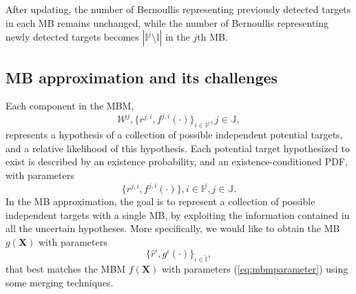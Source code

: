 \documentclass[journal]{IEEEtran}
\begin{document}
After updating, the number of Bernoullis representing previously detected targets in each MB remains unchanged, while the number of Bernoullis representing newly detected targets becomes $|\mathbb{I}^j\setminus\mathbb{I}|$ in the $j$th MB. 

\subsection{MB approximation and its challenges}
\label{section:challenge}
Each component in the MBM,
\begin{equation}
    \mathcal{W}^j,\{r^{j,i},f^{j,i}(\cdot)\}_{i\in\mathbb{I}^j}, j\in\mathbb{J},
\end{equation}
represents a hypothesis of a collection of possible independent potential targets, and a relative likelihood of this hypothesis. Each potential target hypothesized to exist is described by an existence probability, and an existence-conditioned PDF, with parameters
\begin{equation}
    \{r^{j,i},f^{j,i}(\cdot)\}, i\in\mathbb{I}^j, j\in\mathbb{J}.
    \label{eq:mbmparameter}
\end{equation}
In the MB approximation, the goal is to represent a collection of possible independent targets with a single MB, by exploiting the information contained in all the uncertain hypotheses. More specifically, we would like to obtain the MB $g(\mathbf{X})$ with parameters
\begin{equation}
    \{\hat{r}^{\iota},g^{\iota}(\cdot)\}_{{\iota}\in\hat{\mathbb{I}}}
    \label{eq:approxmb},
\end{equation}
that best matches the MBM $f(\mathbf{X})$ with parameters (\ref{eq:mbmparameter}) using some merging techniques.
\end{document}
